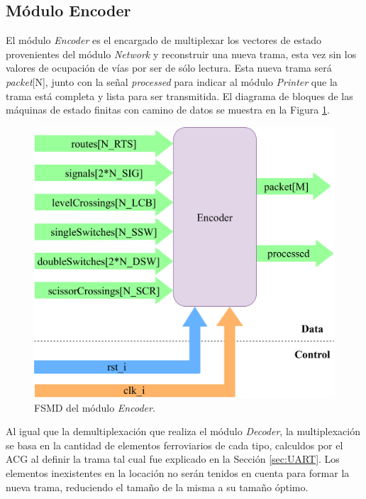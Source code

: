 \subsection{Módulo Encoder}
	\label{sec:encoder}
	
	El módulo \textit{Encoder} es el encargado de multiplexar los vectores de estado provenientes del módulo \textit{Network} y reconstruir una nueva trama, esta vez sin los valores de ocupación de vías por ser de sólo lectura. Esta nueva trama será \textit{packet}[N], junto con la señal \textit{processed} para indicar al módulo \textit{Printer} que la trama está completa y lista para ser transmitida. El diagrama de bloques de las máquinas de estado finitas con camino de datos se muestra en la Figura \ref{fig:Encoder_module}.
	
	\begin{figure}[H]
		\centering
		\includegraphics[width=1\textwidth]{Figuras/Encoder_module.png}
		\centering\caption{FSMD del módulo \textit{Encoder}.}
		\label{fig:Encoder_module}
	\end{figure}
	
	Al igual que la demultiplexación que realiza el módulo \textit{Decoder}, la multiplexación se basa en la cantidad de elementos ferroviarios de cada tipo, calculdos por el ACG al definir la trama tal cual fue explicado en la Sección \ref{sec:UART}. Los elementos inexistentes en la locación no serán tenidos en cuenta para formar la nueva trama, reduciendo el tamaño de la misma a su tamaño óptimo.
